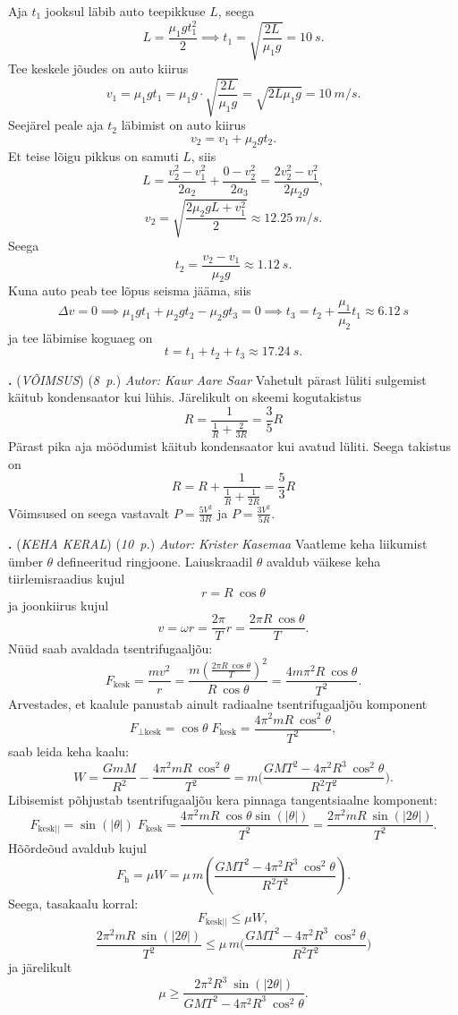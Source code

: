 \documentclass[11pt,a5paper]{article}
\newcommand{\numb}[1]{\vspace{5pt}\textbf{\large #1}}
\newcommand{\nimi}[1]{(\textsl{\small #1})}
\newcommand{\punktid}[1]{(\emph{#1~p.})}
\newcounter{ylesanne}
\newcommand{\yl}[1]{\addtocounter{ylesanne}{1}\numb{\theylesanne.} \nimi{#1} \newblock{}}
\newcommand{\autor}[1]{\emph{ Autor: #1}} %
\begin{document}
Aja $t_1$ jooksul läbib auto teepikkuse $L$, seega
\[
  L=\frac{\mu_1 g t_1^2}{2} \implies t_1 = \sqrt{\frac{2L}{\mu_1 g}} = \SI{10}{s}.
\]
Tee keskele jõudes on auto kiirus
\[
  v_1 = \mu_1 g t_1 = \mu_1 g \cdot \sqrt{\frac{2L}{\mu_1 g}} = \sqrt{2L\mu_1 g} = \SI{10}{m/s}.
\]
Seejärel peale aja $t_2$ läbimist on auto kiirus
\[
  v_2 = v_1 + \mu_2 g t_2.
\]
Et teise lõigu pikkus on samuti $L$, siis
\[
  L = \frac{v_2^2 - v_1^2}{2a_2} + \frac{0-v_2^2}{2a_3} = \frac{2v_2^2 - v_1^2}{2\mu_2 g},
\]
\[
  v_2 = \sqrt{\frac{2\mu_2 gL+v_1^2}{2}} \approx \SI{12.25}{m/s}.
\]
Seega
\[
  t_2 = \frac{v_2-v_1}{\mu_2 g} \approx \SI{1.12}{s}.
\]
Kuna auto peab tee lõpus seisma jääma, siis
\[
  \Delta v = 0 \implies \mu_1 g t_1 + \mu_2 g t_2 - \mu_2 g t_3 = 0 \implies t_3 = t_2 + \frac{\mu_1}{\mu_2}t_1 \approx \SI{6.12}{s}
\]
ja tee läbimise koguaeg on
\[
  t=t_1+t_2+t_3 \approx \SI{17,24}{s}.
\]


\yl{VÕIMSUS}
\punktid{8} \autor{Kaur Aare Saar}
Vahetult pärast lüliti sulgemist käitub kondensaator kui lühis. Järelikult on skeemi kogutakistus
\[
  R=\frac{1}{\frac 1R + \frac 2{3R}}=\frac 35 R
\]
Pärast pika aja möödumist käitub kondensaator kui avatud lüliti. Seega takistus on
\[
  R=R+\frac{1}{\frac 1R + \frac 1{2R}}=\frac 53 R
\]
Võimsused on seega vastavalt $P=\frac{5V^2}{3R}$ ja $P=\frac{3V^2}{5R}$.


\yl{KEHA KERAL}
\punktid{10} \autor{Krister Kasemaa}
\osa Vaatleme keha liikumist ümber $\theta$ defineeritud ringjoone. Laiuskraadil $\theta$ avaldub väikese keha tiirlemisraadius kujul
\[
  r=R \: \cos \theta
\]
ja joonkiirus kujul
\[
  v= \omega r= \frac{2 \pi }{T} r = \frac{2 \pi R \: \cos \theta}{T}.
\]
Nüüd saab avaldada tsentrifugaaljõu:
\[
  F_{\mathrm{ kesk}}=\frac{m v^2}{r} =\frac{m \left(\frac{2 \pi R \: \cos \theta}{T}\right)^2}{R \: \cos \theta}=\frac{4 m \pi^2 R \: \cos \theta}{T^2}.
\]
Arvestades, et kaalule panustab ainult radiaalne tsentrifugaaljõu komponent
\[
  F_{\mathrm{\bot kesk}}= \cos \theta \; F_{\mathrm{ kesk}} = \frac{4 \pi^2 m R \: \cos ^2 \theta}{T^2},
\]
saab leida keha kaalu:
\[
  W=\frac{G m M}{R^2} - \frac{4 \pi^2 m R \: \cos ^2 \theta}{T^2} = m\bigg(\frac{G M T^2 - 4 \pi^2 R^3 \: \cos ^2 \theta }{R^2 T^2}\bigg).
\]
\osa Libisemist põhjustab tsentrifugaaljõu kera pinnaga tangentsiaalne komponent:
\[
  F_{\mathrm{kesk || }}= \sin(|\theta|) \; F_{\mathrm{ kesk}} = \frac{4 \pi^2 m R \: \cos \theta \sin(|\theta|)}{T^2}=\frac{2 \pi^2 m R \: \sin(|2\theta|)}{T^2} .
\]
Hõõrdeõud avaldub kujul
\[
  F_{\mathrm{h}}=\mu W = \mu \, m\left(\frac{G M T^2 - 4 \pi^2 R^3 \: \cos ^2 \theta }{R^2 T^2}\right).
\]
Seega, tasakaalu korral:
\[
  F_{\mathrm{kesk || }} \leq \mu W,
\]
\[
  \frac{2 \pi^2 m R \: \sin(|2\theta|)}{T^2} \leq
  \mu \, m\bigg(\frac{G M T^2 - 4 \pi^2 R^3 \: \cos ^2 \theta }{R^2 T^2}\bigg)
\]
ja järelikult
\[
  \mu \geq \frac{2 \pi^2 R^3 \: \sin(|2\theta|)}{G M T^2 - 4 \pi^2 R^3 \: \cos ^2 \theta }.
\]
\end{document}
